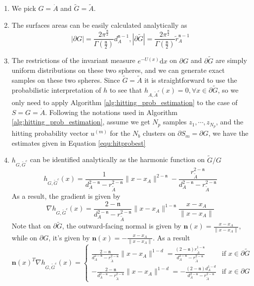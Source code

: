 \documentclass[english, aip, jcp, priprint, graphicx,floatfix]{revtex4-1}
\theoremstyle{plain}
\theoremstyle{definition}
\theoremstyle{plain}
\newcommand{\dimension}{{\mathfrak{n}}}
\begin{document}
\begin{enumerate}
	\item We pick $G = \dot{A}$ and $\tilde{G} = \tilde{A}$.
	\item The surfaces areas can be easily calculated analytically as
\[|\partial G| = \frac{2\pi^{\frac{\dimension}{2}}}{\Gamma(\frac{\dimension}{2})}d_A^{\dimension - 1}, |\partial \tilde{G}| = \frac{2\pi^{\frac{\dimension}{2}}}{\Gamma(\frac{\dimension}{2})}\tilde{r}_A^{\dimension - 1}\]
	\item The restrictions of the invariant measure $e^{- U (x)} \mathrm{d} x$ on $\partial G$ and $\partial \tilde{G}$ are simply uniform distributions on these two spheres, and we can generate exact samples on these two spheres. Since $\tilde{G} = \tilde{A}$ it is straightforward to use the probabilistic interpretation of $h$ to see that $h_{A, \tilde{A}^c} (x) = 0, \forall x \in \partial \tilde{G}$, so we only need to apply Algorithm \ref{alg:hitting_prob_estimation} to the case of $S=G=\dot{A}$. Following the notations used in Algorithm \ref{alg:hitting_prob_estimation}, assume we get $N_p$ samples $z_1,\cdots, z_{N_p}$, and the hitting probability vector $u^{(m)}$ for the $N_b$ clusters on $\partial S_m = \partial G$, we have the estimates given in Equation \ref{equ:hitprobest}
	\item $h_{G, \tilde{G}^c}$ can be identified analytically as the harmonic function on $\tilde{G} / G$\cite{Wendel1980-sj}
\[ h_{G, \tilde{G}^c} (x) = \frac{1}{d_A^{2 - \dimension} - r_{\tilde{A}}^{2 - \dimension}} \| x
- x_A \|^{2 - \dimension} - \frac{r_{\tilde{A}}^{2 - \dimension}}{d_A^{2 - \dimension} -
r_{\tilde{A}}^{2 - \dimension}} \]
As a result, the gradient is given by
\[ \nabla h_{G, \tilde{G}^c} (x) = \frac{2 - \dimension}{d_A^{2 - \dimension} - r_{\tilde{A}}^{2
   - \dimension}} \| x - x_A \|^{1 - \dimension} \frac{x - x_A}{\| x - x_A \|} \]
Note that on $\partial \tilde{G}$, the outward-facing normal is given by ${\textbf{n}} (x) = \frac{x - x_A}{\| x - x_A \|}$, while on $\partial G$, it's given by ${\textbf{n}} (x) = -\frac{x - x_A}{\| x - x_A \|}$. As a result
\[
	{\textbf{n}} (x)^T \nabla h_{G, \tilde{G}^c} (x) = 
\begin{cases}
	\frac{2 - \dimension}{d_A^{2 - \dimension} - r_{\tilde{A}}^{2 - \dimension}} \| x - x_A \|^{1 - d} = \frac{(2 - \dimension) r_{\tilde{A}}^{1 - \dimension}}{d_A^{2 - \dimension} - r_{\tilde{A}}^{2 - \dimension}} & \text{if }x \in \partial \tilde{G}\\
	-\frac{2 - \dimension}{d_A^{2 - \dimension} - r_{\tilde{A}}^{2 - \dimension}} \| x - x_A \|^{1 - d} = -\frac{(2 - \dimension) d_A^{1 - d}}{d_A^{2 - \dimension} - r_{\tilde{A}}^{2 - \dimension}} & \text{if }x \in \partial G

\end{cases}\]
\end{enumerate}
\end{document}
